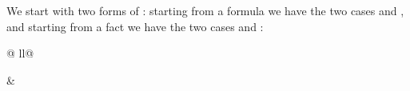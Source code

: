 \begin{isabellebody}
\begin{isamarkuptext}
We start with two forms of :
starting from a formula  we have the two cases  and
, and starting from a fact 
we have the two cases  and :%
\end{isamarkuptext}%
\isamarkuptrue%
%
\begin{tabular}{@ {}ll@ {}}
\begin{minipage}[t]{.4\textwidth}
\end{minipage}
&
\begin{minipage}[t]{.4\textwidth}
\end{minipage}
\end{tabular}
\end{isabellebody}
